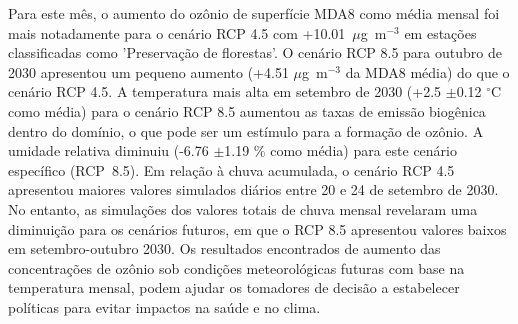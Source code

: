 \begin{spacing}{1.5}
			Para este mês, o aumento do ozônio de superfície MDA8 como média mensal foi mais notadamente para o cenário RCP 4.5 com +10.01~$\mu$g~m$^{-3}$ em estações classificadas como 'Preservação de florestas'. O cenário RCP 8.5 para outubro de 2030 apresentou um pequeno aumento (+4.51 $\mu$g~m$^{-3}$ da MDA8 média) do que o cenário RCP 4.5. A temperatura mais alta em setembro de 2030 (+2.5 $\pm$0.12 $^{\circ}$C como média) para o cenário RCP 8.5 aumentou as taxas de emissão biogênica dentro do domínio, o que pode ser um estímulo para a formação de ozônio. A umidade relativa diminuiu (-6.76 $\pm$1.19 \% como média) para este cenário específico (RCP~8.5). Em relação à chuva acumulada, o cenário RCP 4.5 apresentou maiores valores simulados diários entre 20 e 24 de setembro de 2030. No entanto, as simulações dos valores totais de chuva mensal revelaram uma diminuição para os cenários futuros, em que o RCP 8.5 apresentou valores baixos em setembro-outubro 2030.
			Os resultados encontrados de aumento das concentrações de ozônio sob condições meteorológicas futuras com base na temperatura mensal, podem ajudar os tomadores de decisão a estabelecer políticas para evitar impactos na saúde e no clima.
		\cleardoublepage
	
		\thispagestyle{empty} \tableofcontents \cleardoublepage

		\thispagestyle{empty} \listoftables \cleardoublepage	
		
		\thispagestyle{empty} \listoffigures \cleardoublepage	
	\mainmatter
	\pagestyle{mainmatter}
		
		
		
		

	
	
	 \clearpage

	\begin{appendix}
		
	\end{appendix}
	
\end{spacing}


